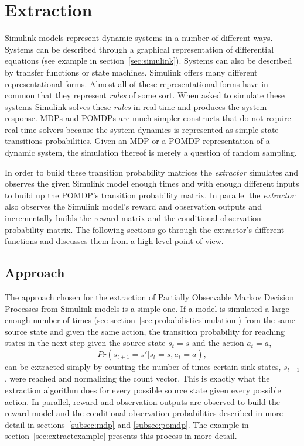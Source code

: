 \section{Extraction}

Simulink models represent dynamic systems in a number of different ways. Systems can be described through a graphical representation of differential equations (see example in section~\ref{sec:simulink}). Systems can also be described by transfer functions or state machines. Simulink offers many different representational forms. Almost all of these representational forms have in common that they represent \textit{rules} of some sort. When asked to simulate these systems Simulink solves these \textit{rules} in real time and produces the system response. MDPs and POMDPs are much simpler constructs that do not require real-time solvers because the system dynamics is represented as simple state transitions probabilities. Given an MDP or a POMDP representation of a dynamic system, the simulation thereof is merely a question of random sampling.

In order to build these transition probability matrices the \textit{extractor} simulates and observes the given Simulink model enough times and with enough different inputs to build up the POMDP's transition probability matrix. In parallel the \textit{extractor} also observes the Simulink model's reward and observation outputs and incrementally builds the reward matrix and the conditional observation probability matrix. The following sections go through the extractor's different functions and discusses them from a high-level point of view.

\subsection{Approach}
\label{subsec:approach}

The approach chosen for the extraction of Partially Observable Markov Decision Processes from Simulink models is a simple one. If a model is simulated a large enough number of times (see section~\ref{sec:probabilisticsimulation}) from the same source state and given the same action, the transition probability for reaching states in the next step given the source state $s_t = s$ and the action $a_t = a$,
\[
Pr(s_{t+1} = s'|s_t = s, a_t = a),
\]
can be extracted simply by counting the number of times certain sink states, $s_{t+1}$, were reached and normalizing the count vector. This is exactly what the extraction algorithm does for every possible source state given every possible action. In parallel, reward and observation outputs are observed to build the reward model and the conditional observation probabilities described in more detail in sections~\ref{subsec:mdp} and \ref{subsec:pomdp}. The example in section~\ref{sec:extractexample} presents this process in more detail.

